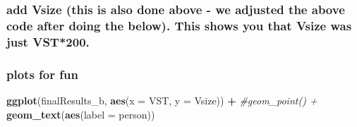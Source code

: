 \documentclass[
]{article}
\newenvironment{Shaded}{\begin{snugshade}}{\end{snugshade}}
\newcommand{\CommentTok}[1]{\textcolor[rgb]{0.56,0.35,0.01}{\textit{#1}}}
\newcommand{\DataTypeTok}[1]{\textcolor[rgb]{0.13,0.29,0.53}{#1}}
\newcommand{\DecValTok}[1]{\textcolor[rgb]{0.00,0.00,0.81}{#1}}
\newcommand{\KeywordTok}[1]{\textcolor[rgb]{0.13,0.29,0.53}{\textbf{#1}}}
\newcommand{\NormalTok}[1]{#1}
\newcommand{\OperatorTok}[1]{\textcolor[rgb]{0.81,0.36,0.00}{\textbf{#1}}}
\newcommand{\StringTok}[1]{\textcolor[rgb]{0.31,0.60,0.02}{#1}}
\begin{document}
\hypertarget{add-vsize-this-is-also-done-above---we-adjusted-the-above-code-after-doing-the-below.-this-shows-you-that-vsize-was-just-vst200.}{%
\subsubsection{add Vsize (this is also done above - we adjusted the
above code after doing the below). This shows you that Vsize was just
VST*200.}\label{add-vsize-this-is-also-done-above---we-adjusted-the-above-code-after-doing-the-below.-this-shows-you-that-vsize-was-just-vst200.}}

\begin{Shaded}
\end{Shaded}

\hypertarget{plots-for-fun}{%
\subsubsection{plots for fun}\label{plots-for-fun}}

\begin{Shaded}
\begin{Highlighting}[]
\KeywordTok{ggplot}\NormalTok{(finalResults_b, }\KeywordTok{aes}\NormalTok{(}\DataTypeTok{x =}\NormalTok{ VST, }\DataTypeTok{y =}\NormalTok{ Vsize)) }\OperatorTok{+}
\StringTok{  }\CommentTok{#geom_point() + }
\StringTok{  }\KeywordTok{geom_text}\NormalTok{(}\KeywordTok{aes}\NormalTok{(}\DataTypeTok{label =}\NormalTok{ person))}
\end{Highlighting}
\end{Shaded}
\end{document}
